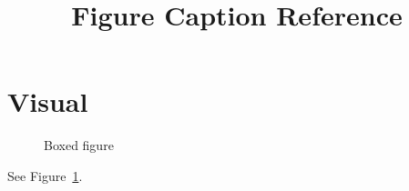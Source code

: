 \documentclass{article}
\begin{document}
\title{Figure Caption Reference}\maketitle
\section{Visual}\begin{figure}[h]\centering{}\caption{Boxed figure}\label{fig:box}\end{figure} See Figure~\ref{fig:box}.
\end{document}
